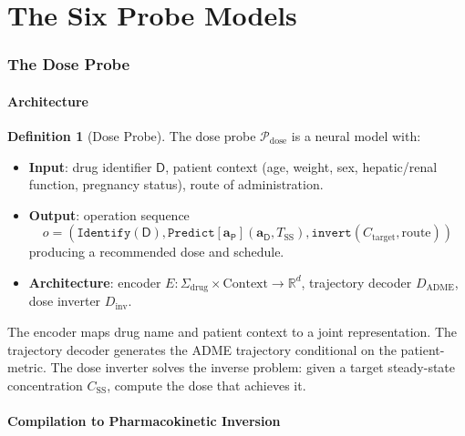 \documentclass[11pt,twocolumn,a4paper]{article}
\theoremstyle{definition}
\newtheorem{definition}[theorem]{Definition}
\theoremstyle{remark}
\newcommand{\R}{\mathbb{R}}
\newcommand{\probe}{\mathcal{P}}
\newcommand{\drugaddr}{\mathbf{a}_{\mathsf{D}}}
\newcommand{\patientaddr}{\mathbf{a}_{\mathsf{P}}}
\begin{document}
\part{The Six Probe Models}

\section{The Dose Probe}
\label{sec:dose_probe}

\subsection{Architecture}

\begin{definition}[Dose Probe]
\label{def:dose_probe}
The dose probe $\probe_{\mathrm{dose}}$ is a neural model with:
\begin{itemize}[nosep,leftmargin=*]
\item \textbf{Input}: drug identifier $\mathsf{D}$, patient context (age, weight, sex, hepatic/renal function, pregnancy status), route of administration.
\item \textbf{Output}: operation sequence
\begin{equation*}
o = (\texttt{Identify}(\mathsf{D}), \texttt{Predict}[\patientaddr](\drugaddr, T_{\mathrm{SS}}), \texttt{invert}(C_{\mathrm{target}}, \mathrm{route}))
\end{equation*}
producing a recommended dose and schedule.
\item \textbf{Architecture}: encoder $E: \Sigma_{\mathrm{drug}} \times \text{Context} \to \R^{d}$, trajectory decoder $D_{\mathrm{ADME}}$, dose inverter $D_{\mathrm{inv}}$.
\end{itemize}
\end{definition}

The encoder maps drug name and patient context to a joint representation. The trajectory decoder generates the ADME trajectory conditional on the patient-metric. The dose inverter solves the inverse problem: given a target steady-state concentration $C_{\mathrm{SS}}$, compute the dose that achieves it.

\subsection{Compilation to Pharmacokinetic Inversion}
\end{document}
